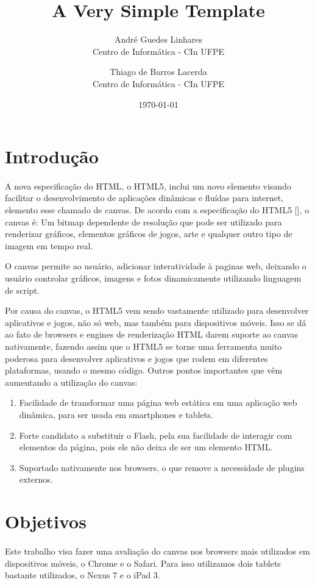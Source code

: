\documentclass[12pt]{article}
\title{A Very Simple \LaTeXe{} Template}
\author{
        André Guedes Linhares\\
        Centro de Informática - CIn UFPE\\
            \and
        Thiago de Barros Lacerda\\
        Centro de Informática - CIn UFPE\\
}
\date{\today}
\begin{document}
\maketitle

\section{Introdução}

\paragraph{}
A nova especificação do HTML, o HTML5, inclui um novo elemento visando facilitar o desenvolvimento de aplicações
dinâmicas e fluídas para internet, elemento esse chamado de canvas. De acordo com a especificação do HTML5 [], o canvas
é:
Um bitmap dependente de resolução que pode ser utilizado para renderizar gráficos, elementos gráficos de jogos, arte e
qualquer outro tipo de imagem em tempo real.

O canvas permite ao usuário, adicionar interatividade à paginas web, deixando o usuário controlar gráficos, imagens e
fotos dinamicamente utilizando linguagem de script.

Por causa do canvas, o HTML5 vem sendo vastamente utilizado para desenvolver aplicativos e jogos, não só web, mas também
para dispositivos móveis. Isso se dá ao fato de browsers e engines de renderização HTML darem suporte ao canvas
nativamente, fazendo assim que o HTML5 se torne uma ferramenta muito poderosa para desenvolver aplicativos e jogos que
rodem em diferentes plataformas, usando o mesmo código. Outros pontos importantes que vêm aumentando a utilização do
canvas:
\begin{enumerate}
\item Facilidade de transformar uma página web estática em uma aplicação web dinâmica, para ser usada em smartphones e
tablets.
\item Forte candidato a substituir o Flash, pela sua facilidade de interagir com elementos da página, pois ele não deixa de
ser um elemento HTML.
\item Suportado nativamente nos browsers, o que remove a necessidade de plugins externos.
\end{enumerate}


\section{Objetivos}

\paragraph{}
Este trabalho visa fazer uma avaliação do canvas nos browsers mais utilizados em dispositivos móveis, o Chrome e o
Safari. Para isso utilizamos dois tablets bastante utilizados, o Nexus 7 e o iPad 3.
\end{document}
